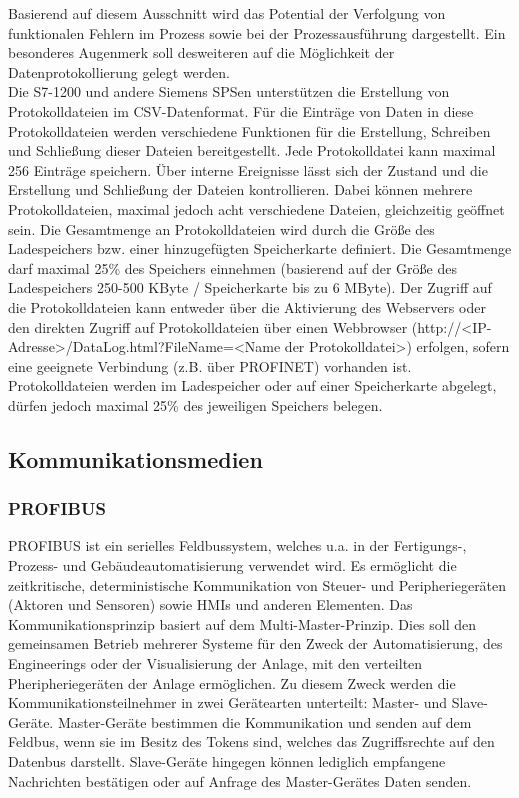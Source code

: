 Basierend auf diesem Ausschnitt wird das Potential der Verfolgung von funktionalen Fehlern im Prozess sowie bei der Prozessausführung dargestellt. Ein besonderes Augenmerk soll desweiteren auf die Möglichkeit der Datenprotokollierung gelegt werden.\\

Die S7-1200 und andere Siemens SPSen unterstützen die Erstellung von Protokolldateien im CSV-Datenformat. Für die Einträge von Daten in diese Protokolldateien werden verschiedene Funktionen für die Erstellung, Schreiben und Schließung dieser Dateien bereitgestellt. Jede Protokolldatei kann maximal 256 Einträge speichern. Über interne Ereignisse lässt sich der Zustand und die Erstellung und Schließung der Dateien kontrollieren. Dabei können mehrere Protokolldateien, maximal jedoch acht verschiedene Dateien, gleichzeitig geöffnet sein. Die Gesamtmenge an Protokolldateien wird durch die Größe des Ladespeichers bzw. einer hinzugefügten Speicherkarte definiert. Die Gesamtmenge darf maximal 25\% des Speichers einnehmen (basierend auf der Größe des Ladespeichers 250-500 KByte / Speicherkarte bis zu 6 MByte). Der Zugriff auf die Protokolldateien kann entweder über die Aktivierung des Webservers oder den direkten Zugriff auf Protokolldateien über einen Webbrowser (\glqq http://<IP-Adresse>/DataLog.html?FileName=<Name der Protokolldatei>\grqq ) erfolgen, sofern eine geeignete Verbindung (z.B. über PROFINET) vorhanden ist. 
Protokolldateien werden im Ladespeicher oder auf einer Speicherkarte abgelegt, dürfen jedoch maximal 25\% des jeweiligen Speichers belegen.



\subsection{Kommunikationsmedien}
\subsubsection{PROFIBUS}
PROFIBUS ist ein serielles Feldbussystem, welches u.a. in der Fertigungs-, Prozess- und Gebäudeautomatisierung verwendet wird. Es ermöglicht die zeitkritische, deterministische Kommunikation von Steuer- und Peripheriegeräten (Aktoren und Sensoren) sowie HMIs und anderen Elementen. Das Kommunikationsprinzip basiert auf dem Multi-Master-Prinzip. Dies soll den gemeinsamen Betrieb mehrerer Systeme für den Zweck der Automatisierung, des Engineerings oder der Visualisierung der Anlage, mit den verteilten Pheripheriegeräten der Anlage ermöglichen. Zu diesem Zweck werden die Kommunikationsteilnehmer in zwei Gerätearten unterteilt: Master- und Slave-Geräte. Master-Geräte bestimmen die Kommunikation und senden auf dem Feldbus, wenn sie im Besitz des Tokens sind, welches das Zugriffsrechte auf den Datenbus darstellt. Slave-Geräte hingegen können lediglich empfangene Nachrichten bestätigen oder auf Anfrage des Master-Gerätes Daten senden\citep{Profibus1}.\\

